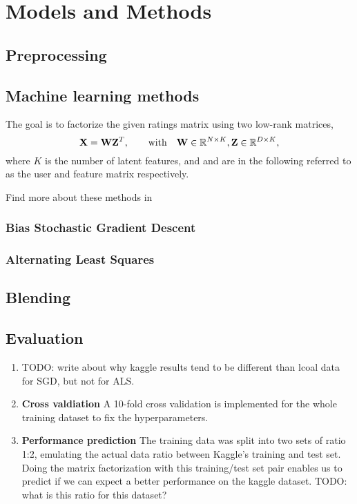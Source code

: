 \section{Models and Methods}

\subsection{Preprocessing}



\subsection{Machine learning methods}
\label{sec:methods}

The goal is to factorize the given ratings matrix using two low-rank matrices, 
\begin{equation}
  \mathbf{X} = \mathbf{W}\mathbf{Z}^T ,\hspace{2em} \text{with} \hspace{1em} \mathbf{W} \in\mathbb{R}^{N \times K},
  \mathbf{Z} \in\mathbb{R}^{D \times K}, 
\end{equation}
where $K$ is the number of latent features, and  and  are in the following
referred to as the user and feature matrix respectively.

Find more about these methods in \cite{Aberger2009}

\subsubsection{Bias Stochastic Gradient Descent}



\subsubsection{Alternating Least Squares}


\subsection{Blending}



\subsection{Evaluation}

\begin{enumerate}
  \item TODO: write about why kaggle results tend to be different than lcoal data for
    SGD, but not for ALS.
  \item \textbf{Cross valdiation} A 10-fold cross validation is implemented
    for the whole training dataset to fix the hyperparameters. 

  \item \textbf{Performance prediction} The training data was split into two
    sets of ratio 1:2, emulating the actual data ratio between Kaggle's training
    and test set. Doing the matrix factorization with this training/test set
    pair enables us to predict if we can expect a better performance on the
    kaggle dataset.  
    TODO: what is this ratio for this dataset? 
\end{enumerate}

